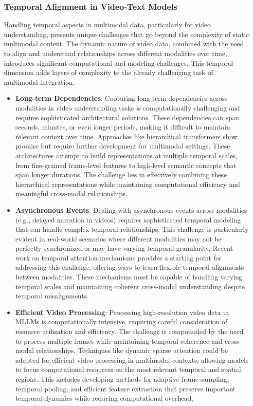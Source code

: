 \subsubsection{Temporal Alignment in Video-Text Models}
Handling temporal aspects in multimodal data, particularly for video understanding, presents unique challenges that go beyond the complexity of static multimodal content. The dynamic nature of video data, combined with the need to align and understand relationships across different modalities over time, introduces significant computational and modeling challenges. This temporal dimension adds layers of complexity to the already challenging task of multimodal integration.

\begin{itemize}
    \item \textbf{Long-term Dependencies}: Capturing long-term dependencies across modalities in video understanding tasks is computationally challenging and requires sophisticated architectural solutions. These dependencies can span seconds, minutes, or even longer periods, making it difficult to maintain relevant context over time. Approaches like hierarchical transformers \citep{liu2021video} show promise but require further development for multimodal settings. These architectures attempt to build representations at multiple temporal scales, from fine-grained frame-level features to high-level semantic concepts that span longer durations. The challenge lies in effectively combining these hierarchical representations while maintaining computational efficiency and meaningful cross-modal relationships.
    
    \item \textbf{Asynchronous Events}: Dealing with asynchronous events across modalities (e.g., delayed narration in videos) requires sophisticated temporal modeling that can handle complex temporal relationships. This challenge is particularly evident in real-world scenarios where different modalities may not be perfectly synchronized or may have varying temporal granularity. Recent work on temporal attention mechanisms provides a starting point for addressing this challenge, offering ways to learn flexible temporal alignments between modalities. These mechanisms must be capable of handling varying temporal scales and maintaining coherent cross-modal understanding despite temporal misalignments.
    
    \item \textbf{Efficient Video Processing}: Processing high-resolution video data in MLLMs is computationally intensive, requiring careful consideration of resource utilization and efficiency. The challenge is compounded by the need to process multiple frames while maintaining temporal coherence and cross-modal relationships. Techniques like dynamic sparse attention \citep{child2019generating} could be adapted for efficient video processing in multimodal contexts, allowing models to focus computational resources on the most relevant temporal and spatial regions. This includes developing methods for adaptive frame sampling, temporal pooling, and efficient feature extraction that preserve important temporal dynamics while reducing computational overhead.
\end{itemize}

